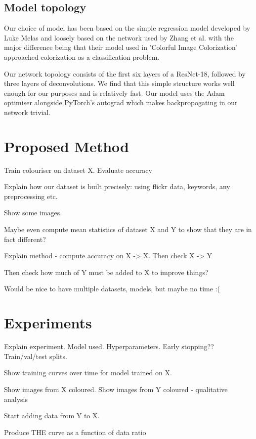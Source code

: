 \documentclass[conference]{IEEEtran}
\begin{document}
\subsection{Model topology}

Our choice of model has been based on the simple regression model developed by Luke Melas and loosely based on the network used by Zhang et al. \cite{zhang2016colorful} with the major difference being that their model used in 'Colorful Image Colorization' approached colorization as a classification problem.

Our network topology consists of the first six layers of a ResNet-18, followed by three layers of deconvolutions. We find that this simple structure works well enough for our purposes and is relatively fast. Our model uses the Adam optimiser alongside PyTorch's autograd which makes backpropogating in our network trivial.

\section{Proposed Method}

Train colouriser on dataset X. Evaluate accuracy

Explain how our dataset is built precisely: using flickr data, keywords, any preprocessing etc. 

Show some images. 

Maybe even compute mean statistics of dataset X and Y to show that they are in fact different?

Explain method - compute accuracy on X -> X.
Then check X -> Y

Then check how much of Y must be added to X to improve things?

Would be nice to have multiple datasets, models, but maybe no time :(

\section{Experiments}

Explain experiment. Model used. Hyperparameters. Early stopping?? Train/val/test splits.

Show training curves over time for model trained on X. 

Show images from X coloured.
Show images from Y coloured - qualitative analysis

Start adding data from Y to X. 

Produce THE curve as a function of data ratio
\end{document}
